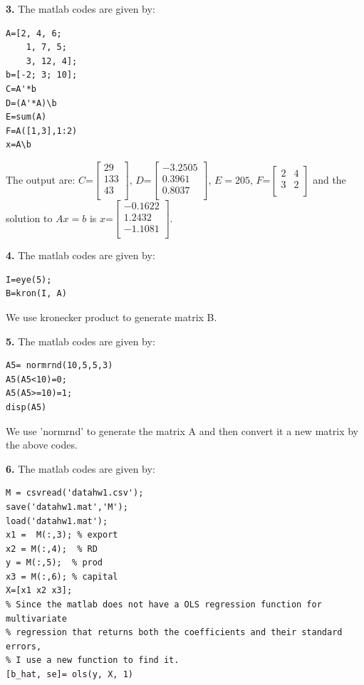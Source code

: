\documentclass[10pt]{article}
\begin{document}
\noindent
\textbf{3.} The matlab codes are given by:
\begin{lstlisting}
A=[2, 4, 6; 
    1, 7, 5; 
    3, 12, 4];
b=[-2; 3; 10];
C=A'*b
D=(A'*A)\b
E=sum(A)
F=A([1,3],1:2)
x=A\b
\end{lstlisting}
The output are: $C$=$ %
\begin{bmatrix}
29 \\
133\\
43 \\ %
\end{bmatrix} %
$,
$D$=$ %
\begin{bmatrix}
-3.2505 \\
0.3961 \\
0.8037 \\ %
\end{bmatrix} %
$,
$E=205$,
$F$=$ %
\begin{bmatrix}
2 & 4  \\
3 & 2  \\  %
\end{bmatrix} %
$ and the solution to $Ax=b$ is $x$=$ %
\begin{bmatrix}
-0.1622 \\
 1.2432\\
-1.1081\\ %
\end{bmatrix} %
$. 

\bigskip

\noindent
\textbf{4.} The matlab codes are given by:
\begin{lstlisting}
I=eye(5);
B=kron(I, A)
\end{lstlisting}
We use kronecker product to generate matrix B. 


\bigskip 

\noindent
\textbf{5.}  The matlab codes are given by:
\begin{lstlisting}
A5= normrnd(10,5,5,3)
A5(A5<10)=0;
A5(A5>=10)=1;
disp(A5)
\end{lstlisting}
We use 'normrnd' to generate the matrix A and then convert it a new matrix by the above codes. 


\bigskip

\noindent
\textbf{6.}  The matlab codes are given by:
\begin{lstlisting}
M = csvread('datahw1.csv');
save('datahw1.mat','M');
load('datahw1.mat');
x1 =  M(:,3); % export
x2 = M(:,4);  % RD
y = M(:,5);  % prod
x3 = M(:,6); % capital
X=[x1 x2 x3];
% Since the matlab does not have a OLS regression function for multivariate
% regression that returns both the coefficients and their standard errors,
% I use a new function to find it. 
[b_hat, se]= ols(y, X, 1)
\end{lstlisting}
\end{document}
